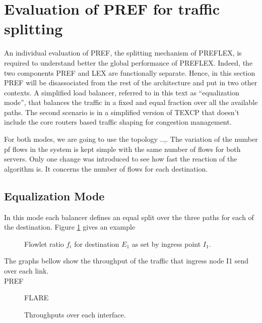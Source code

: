 \section{Evaluation of PREF for traffic splitting}

An individual evaluation of PREF, the splitting mechanism of PREFLEX, is required to understand better the global performance of PREFLEX. Indeed, the two components PREF and LEX are functionally separate. Hence, in this section PREF will be disassociated from the rest of the architecture and put in two other contexts. A simplified load balancer, referred to in this text as “equalization mode”, that balances the traffic in a fixed and equal fraction over all the available paths. The second scenario is in a simplified version of TEXCP that doesn't include the core routers based traffic shaping for congestion management. 

For both modes, we are going to use the topology ..,. The variation of the number pf flows in the system is kept simple with the same number of flows for both servers. Only one change was introduced to see how fast the reaction of the algorithm is. It concerns the number of flows for each destination.

\subsection{Equalization Mode}

In this mode each balancer defines an equal split over the three paths for each of the destination. Figure \ref{fig:fwnd} gives an example

 \begin{figure}[h]
  \begin{center}
\caption{
  Flowlet ratio $f_{i}$ for destination $E_{1}$ as set by ingress point $I_{1}$.
    \label{fig:fwnd}
}
 \end{center}
\end{figure}

The graphs bellow show the throughput of the traffic that ingress node I1 send over each link.\\

PREF

\begin{figure}[h]
 \begin{center}

\caption{
  Throughputs over each interface.
    \label{fig:equal-thro-pref}
}
\end{center}

FLARE

\end{figure}

